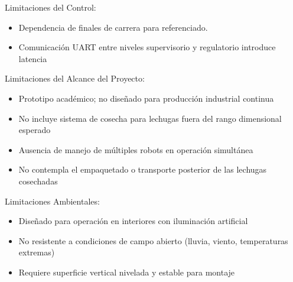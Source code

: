 Limitaciones del Control:
\begin{itemize}[label=\textbullet]
    \item Dependencia de finales de carrera para referenciado.
    \item Comunicación UART entre niveles supervisorio y regulatorio introduce latencia
\end{itemize}

Limitaciones del Alcance del Proyecto:
\begin{itemize}[label=\textbullet]
    \item Prototipo académico; no diseñado para producción industrial continua
    \item No incluye sistema de cosecha para lechugas fuera del rango dimensional esperado
    \item Ausencia de manejo de múltiples robots en operación simultánea
    \item No contempla el empaquetado o transporte posterior de las lechugas cosechadas
\end{itemize}

Limitaciones Ambientales:
\begin{itemize}[label=\textbullet]
    \item Diseñado para operación en interiores con iluminación artificial
    \item No resistente a condiciones de campo abierto (lluvia, viento, temperaturas extremas)
    \item Requiere superficie vertical nivelada y estable para montaje
\end{itemize}


